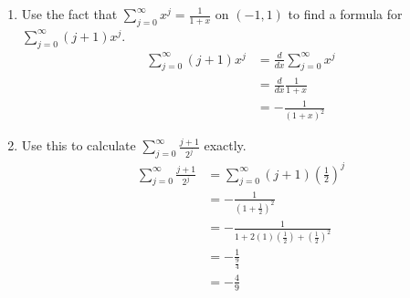 \documentclass{article}
\begin{document}
\begin{enumerate}
\begin{enumerate}
\begin{proof}
                              Because $f(x)$ is continuously differentiable, we can be certain that
                              \begin{align*}
                                    \frac{d}{dx}\sum_{j=0}^\infty x^j & = \sum_{j=0}^\infty \frac{d}{dx} x^j \\
                                                                      & = \sum_{j=0}^\infty jx^{j-1}         \\
                                                                      & = 0 + \sum_{j=1}^\infty jx^{j-1}     \\
                                                                      & = \sum_{j=0}^\infty(j+1)x_j.
                              \end{align*}
                        \end{proof}
                  \item Use the fact that $\sum_{j=0}^\infty x^j=\frac{1}{1+x}$ on
                        $(-1,1)$ to find a formula for $\sum_{j=0}^\infty(j+1)x^j$.
                        \begin{align*}
                              \sum_{j=0}^\infty(j+1)x^j & = \frac{d}{dx}\sum_{j=0}^\infty x^j \\
                                                        & = \frac{d}{dx}\frac{1}{1+x}         \\
                                                        & = -\frac{1}{(1+x)^2}
                        \end{align*}
                  \item Use this to calculate $\sum_{j=0}^\infty\frac{j+1}{2^j}$ exactly.
                        \begin{align*}
                              \sum_{j=0}^\infty\frac{j+1}{2^j} & = \sum_{j=0}^\infty (j+1)\left(\frac{1}{2}\right)^j                    \\
                                                               & = -\frac{1}{\left(1+\frac{1}{2}\right)^2}                              \\
                                                               & = -\frac{1}{1+2(1)\left(\frac{1}{2}\right)+\left(\frac{1}{2}\right)^2} \\
                                                               & = -\frac{1}{\frac{9}{4}}                                               \\
                                                               & = -\frac{4}{9}

\end{align*}
\end{enumerate}
\end{enumerate}
\end{document}
